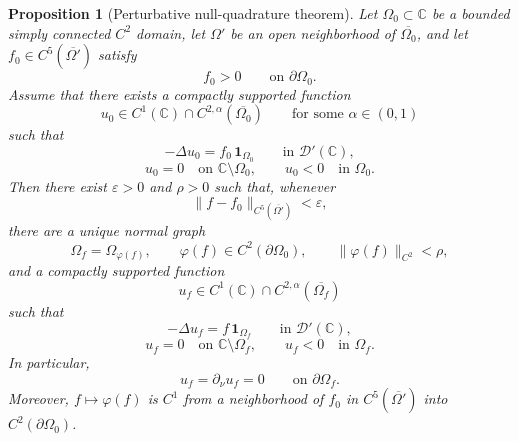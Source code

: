 \documentclass[a4paper,11pt,reqno]{amsart}
\numberwithin{equation}{section}
\theoremstyle{plain} %
\newtheorem{proposition}{Proposition}[section]
\theoremstyle{definition} %
\theoremstyle{remark}
\newcommand{\C}{\mathbb{C}}
\begin{document}
\begin{proposition}[Perturbative null-quadrature theorem]\label{prop:isakov-tailored}
Let \(\Omega_0\subset\C\) be a bounded simply connected \(C^2\) domain, let
\(\Omega'\) be an open neighborhood of \(\overline{\Omega_0}\), and let
\(f_0\in C^5(\overline{\Omega'})\) satisfy
\[
f_0>0 \qquad\text{on }\partial\Omega_0 .
\]
Assume that there exists a compactly supported function
\[
u_0\in C^1(\C)\cap C^{2,\alpha}(\overline{\Omega_0})
\qquad\text{for some }\alpha\in(0,1)
\]
such that
\begin{equation}\label{eq:appendix-reference-problem}
-\Delta u_0=f_0\,\mathbf 1_{\Omega_0}
\qquad\text{in }\mathcal D'(\C),
\end{equation}
\[
u_0=0 \quad\text{on }\C\setminus\Omega_0,
\qquad
u_0<0 \quad\text{in }\Omega_0 .
\]
Then there exist \(\varepsilon>0\) and \(\rho>0\) such that, whenever
\[
\|f-f_0\|_{C^5(\overline{\Omega'})}<\varepsilon,
\]
there are a unique normal graph
\[
\Omega_f=\Omega_{\varphi(f)},\qquad
\varphi(f)\in C^2(\partial\Omega_0),\qquad
\|\varphi(f)\|_{C^2}<\rho,
\]
and a compactly supported function
\[
u_f\in C^1(\C)\cap C^{2,\alpha}(\overline{\Omega_f})
\]
such that
\begin{equation}\label{eq:appendix-perturbed-problem}
-\Delta u_f=f\,\mathbf 1_{\Omega_f}
\qquad\text{in }\mathcal D'(\C),
\end{equation}
\[
u_f=0 \quad\text{on }\C\setminus\Omega_f,
\qquad
u_f<0 \quad\text{in }\Omega_f .
\]
In particular,
\[
u_f=\partial_\nu u_f=0
\qquad\text{on }\partial\Omega_f .
\]
Moreover, \(f\mapsto\varphi(f)\) is \(C^1\) from a neighborhood of \(f_0\) in
\(C^5(\overline{\Omega'})\) into \(C^2(\partial\Omega_0)\).
\end{proposition}
\end{document}
